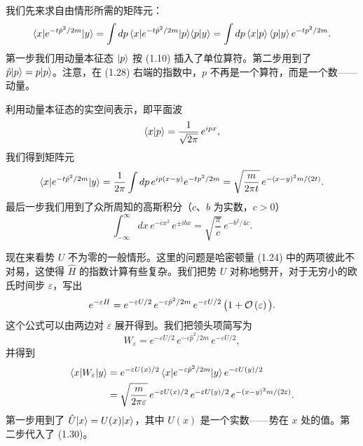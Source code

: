 我们先来求自由情形所需的矩阵元：
\begin{equation}
  \langle x|e^{-t\hat{p}^2/2m}|y\rangle
  = \int dp\,\langle x|e^{-t\hat{p}^2/2m}|p\rangle\langle p|y\rangle
  = \int dp\,\langle x|p\rangle\,\langle p|y\rangle\,e^{-tp^2/2m}.
\end{equation}
第一步我们用动量本征态 $|p\rangle$ 按 (1.10) 插入了单位算符。第二步用到了 $\hat{p}|p\rangle = p|p\rangle$。注意，在 (1.28) 右端的指数中，$p$ 不再是一个算符，而是一个数——动量。

利用动量本征态的实空间表示，即平面波
\begin{equation}
  \langle x|p\rangle = \frac{1}{\sqrt{2\pi}}\,e^{ipx},
\end{equation}
我们得到矩阵元
\begin{equation}
  \langle x|e^{-t\hat{p}^2/2m}|y\rangle
  = \frac{1}{2\pi}\int dp\,e^{ip(x-y)}e^{-tp^2/2m}
  = \sqrt{\frac{m}{2\pi t}}\,e^{-(x-y)^2m/(2t)}.
\end{equation}
最后一步我们用到了众所周知的高斯积分（$c$、$b$ 为实数，$c > 0$）
\begin{equation}
  \int_{-\infty}^{\infty}dx\,e^{-cx^2}\,e^{\pm ibx}
  = \sqrt{\frac{\pi}{c}}\,e^{-b^2/4c}.
\end{equation}

现在来看势 $U$ 不为零的一般情形。这里的问题是哈密顿量 (1.24) 中的两项彼此不对易，这使得 $\hat{H}$ 的指数计算有些复杂。我们把势 $U$ 对称地劈开，对于无穷小的欧氏时间步 $\varepsilon$，写出
\begin{equation}
  e^{-\varepsilon H} = e^{-\varepsilon U/2}\,e^{-\varepsilon\hat{p}^2/2m}\,
  e^{-\varepsilon U/2}\,\big(1 + \mathcal{O}\left(\varepsilon\right)\big).
\end{equation}
这个公式可以由两边对 $\varepsilon$ 展开得到。我们把领头项简写为
\begin{equation}
  W_\varepsilon = e^{-\varepsilon U/2}\,e^{-\varepsilon\hat{p}^2/2m}\,
  e^{-\varepsilon U/2},
\end{equation}
并得到
\begin{equation}
  \begin{split}
    \langle x|W_\varepsilon|y\rangle
    &= e^{-\varepsilon U(x)/2}\,\langle x|e^{-\varepsilon\hat{p}^2/2m}|y\rangle\,
       e^{-\varepsilon U(y)/2}\\
    &= \sqrt{\frac{m}{2\pi\varepsilon}}\,
       e^{-\varepsilon U(x)/2}\,e^{-\varepsilon U(y)/2}\,e^{-(x-y)^2m/(2\varepsilon)}.
  \end{split}
\end{equation}
第一步用到了 $\hat{U}|x\rangle = U(x)|x\rangle$，其中 $U(x)$ 是一个实数——势在 $x$ 处的值。第二步代入了 (1.30)。

